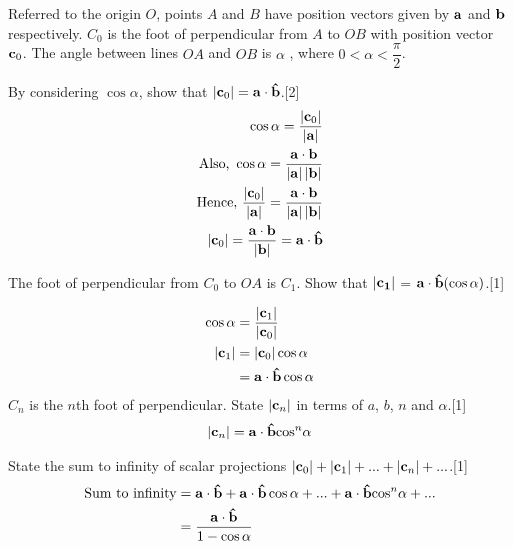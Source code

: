 \documentclass[12pt, a4 paper]{article}
\begin{document}
\begin{outline}[enumerate]
					
	\1 Referred to the origin $O$, points $A$ and $B$ have position vectors given by ${\bf{a}}$ and ${\bf{b}}$ respectively. ${C_0}$ is the foot of perpendicular from $A$ to $OB$ with position vector ${{\bf{c}}_0}$. The angle between lines $OA$ and $OB$ is $\alpha$ , where $ 0< \alpha  < \dfrac{\pi}{2}$.
							    
	\2 By considering $\cos{\alpha}$, show that $|{\bf{c}}_0|= {\bf{a}} \cdot {\bf{\hat b}}$.\hfill[2]
	\color{blue}
	\begin{align*}
		\cos \alpha  = \dfrac{{\left| {{{\bf{c}}_0}} \right|}}{{\left| {\bf{a}} \right|}} 
		                                                                                  \\{\textrm{Also, }}\cos \alpha  = \dfrac{{{\bf{a}} \cdot {\bf{b}}}}{{\left| {\bf{a}} \right|\left| {\bf{b}} \right|}}
		                                                                                  \\{\textrm{Hence, }}\dfrac{{\left| {{{\bf{c}}_0}} \right|}}{{\left| {\bf{a}} \right|}} = \dfrac{{{\bf{a}} \cdot {\bf{b}}}}{{\left| {\bf{a}} \right|\left| {\bf{b}} \right|}}\\\left| {{{\bf{c}}_0}} \right| = \dfrac{{{\bf{a}} \cdot {\bf{b}}}}{{\left| {\bf{b}} \right|}} = {\bf{a}} \cdot {\bf{\hat b}}
	\end{align*}
							        
	\color{black}
	\2 The foot of perpendicular from ${C_0}$ to $OA$ is ${C_1}$. Show that $|\bf{c}_1|$ = ${\bf{a}} \cdot {\bf{\hat b}}(\cos \alpha )$.\hfill[1]
							    
	\color{blue}
	\begin{align*}
		\cos \alpha & = \dfrac{{\left| {{{\bf{c}}_1}} \right|}}{{\left| {{{\bf{c}}_0}} \right|}} \\\left| {{{\bf{c}}_1}} \right| &= \left| {{{\bf{c}}_0}} \right|\cos \alpha  \\&= {\bf{a}} \cdot {\bf{\hat b}}\cos \alpha
	\end{align*}
	\color{black}
	\2 ${C_n}$ is the $n$th foot of perpendicular. State $\left| {{{\bf{c}}_n}} \right|$ in terms of $a$, $b$, $n$ and $\alpha$.\hfill[1]
	\color{blue}
	\begin{align*}
		\left| {{{\bf{c}}_n}} \right| = {\bf{a}} \cdot {\bf{\hat b}}{\cos ^n}\alpha 
	\end{align*}
	\color{black}
							        
	\2 State the sum to infinity of scalar projections $\left| {{{\bf{c}}_0}} \right| + \left| {{{\bf{c}}_1}} \right| + ... + \left| {{{\bf{c}}_n}} \right| + ...$.\hfill[1]
	\color{blue}
	\begin{align*}
		{\textrm{Sum to infinity}} & = {\bf{a}} \cdot {\bf{\hat b}} + {\bf{a}} \cdot {\bf{\hat b}}\cos \alpha  + ... + {\bf{a}} \cdot {\bf{\hat b}}{\cos ^n}\alpha  + ... \\ &= \dfrac{{{\bf{a}} \cdot {\bf{\hat b}}}}{{1 - \cos \alpha }}
	\end{align*}
			

\end{outline}
\end{document}
